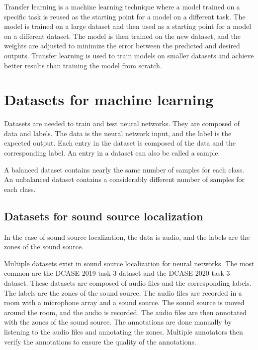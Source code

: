Transfer learning is a machine learning technique where a model trained on a specific task is reused as the starting point for a model on a different task. The model is trained on a large dataset and then used as a starting point for a model on a different dataset. The model is then trained on the new dataset, and the weights are adjusted to minimize the error between the predicted and desired outputs. Transfer learning is used to train models on smaller datasets and achieve better results than training the model from scratch.


\section{Datasets for machine learning}

Datasets are needed to train and test neural networks. They are composed of data and labels. The data is the neural network input, and the label is the expected output. Each entry in the dataset is composed of the data and the corresponding label. An entry in a dataset can also be called a sample. 

A balanced dataset contains nearly the same number of samples for each class. An unbalanced dataset contains a considerably different number of samples for each class.

\subsection{Datasets for sound source localization}
\label{sec:datasetsSSL}

In the case of sound source localization, the data is audio, and the labels are the zones of the sound source. 

Multiple datasets exist in sound source localization for neural networks. The most common are the DCASE 2019 task 3 dataset\cite{Adavanne2019_DCASE} and the DCASE 2020 task 3 dataset\cite{politis2020dataset}. These datasets are composed of audio files and the corresponding labels. The labels are the zones of the sound source. The audio files are recorded in a room with a microphone array and a sound source. The sound source is moved around the room, and the audio is recorded. The audio files are then annotated with the zones of the sound source. The annotations are done manually by listening to the audio files and annotating the zones. Multiple annotators then verify the annotations to ensure the quality of the annotations. 


